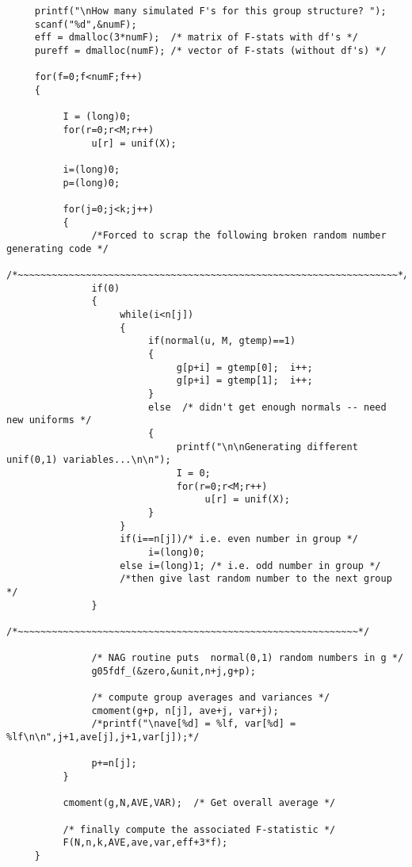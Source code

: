 \documentclass{article}
\begin{document}
\begin{verbatim}
     printf("\nHow many simulated F's for this group structure? ");
     scanf("%d",&numF);
     eff = dmalloc(3*numF);  /* matrix of F-stats with df's */
     pureff = dmalloc(numF); /* vector of F-stats (without df's) */

     for(f=0;f<numF;f++)
     {

          I = (long)0;
          for(r=0;r<M;r++)
               u[r] = unif(X);

          i=(long)0; 
          p=(long)0;

          for(j=0;j<k;j++)
          {
               /*Forced to scrap the following broken random number generating code */
               /*~~~~~~~~~~~~~~~~~~~~~~~~~~~~~~~~~~~~~~~~~~~~~~~~~~~~~~~~~~~~~~~~~~~*/              
               if(0) 
               {
                    while(i<n[j])            
                    {           
                         if(normal(u, M, gtemp)==1)
                         {
                              g[p+i] = gtemp[0];  i++;
                              g[p+i] = gtemp[1];  i++;
                         }
                         else  /* didn't get enough normals -- need new uniforms */
                         {                    
                              printf("\n\nGenerating different unif(0,1) variables...\n\n");
                              I = 0;
                              for(r=0;r<M;r++)
                                   u[r] = unif(X);
                         }
                    }
                    if(i==n[j])/* i.e. even number in group */
                         i=(long)0;
                    else i=(long)1; /* i.e. odd number in group */
                    /*then give last random number to the next group */
               }
               /*~~~~~~~~~~~~~~~~~~~~~~~~~~~~~~~~~~~~~~~~~~~~~~~~~~~~~~~~~~~~*/

               /* NAG routine puts  normal(0,1) random numbers in g */
               g05fdf_(&zero,&unit,n+j,g+p);

               /* compute group averages and variances */
               cmoment(g+p, n[j], ave+j, var+j);  
               /*printf("\nave[%d] = %lf, var[%d] = %lf\n\n",j+1,ave[j],j+1,var[j]);*/
               
               p+=n[j];
          }

          cmoment(g,N,AVE,VAR);  /* Get overall average */

          /* finally compute the associated F-statistic */
          F(N,n,k,AVE,ave,var,eff+3*f);
     }


\end{verbatim}
\end{document}
